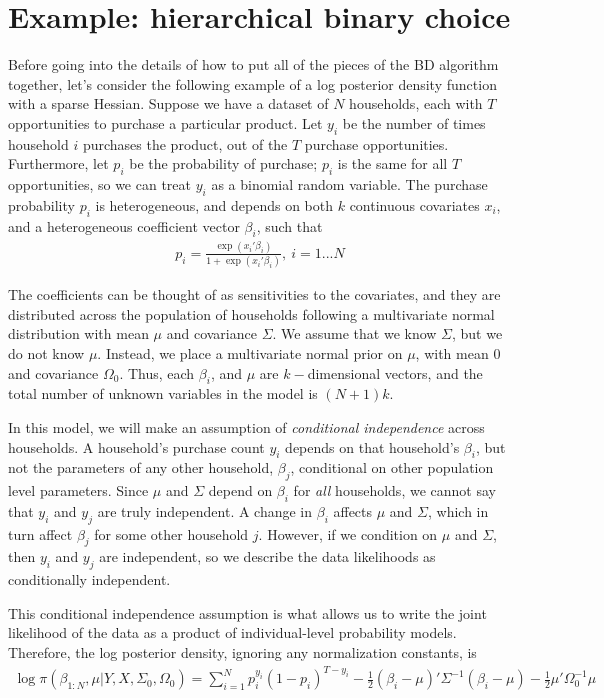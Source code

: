 \documentclass[10pt]{article}\usepackage[]{graphicx}\usepackage[]{color}
\begin{document}
\section{Example:  hierarchical binary choice}\label{sec:example}

Before going into the details of how to put all of the pieces of the
BD algorithm together, let's
consider the following example of a log posterior density function
with a sparse Hessian.
 Suppose we have a dataset of $N$ households, each with $T$
 opportunities to purchase a particular product.  Let $y_i$ be the
 number of times household $i$ purchases the product, out of the $T$
 purchase opportunities.  Furthermore, let $p_i$ be the probability of
 purchase; $p_i$ is the same for all $T$ opportunities, so we can treat $y_i$ as a binomial random variable.  The purchase probability
 $p_i$ is heterogeneous, and depends on both $k$ continuous covariates
 $x_i$, and a heterogeneous coefficient vector $\beta_i$, such that
\begin{align}
  p_i=\frac{\exp(x_i'\beta_i)}{1+\exp(x_i'\beta_i)},~i=1 ... N
\end{align}

The coefficients can be thought of as sensitivities to the covariates,
and they are distributed across the population of households following
a multivariate normal distribution with mean $\mu$ and covariance
$\Sigma$.   We assume that we know $\Sigma$, but we do not know $\mu$.
Instead, we place a multivariate normal prior on $\mu$, with mean $0$
and covariance $\Omega_0$.  Thus, each $\beta_i$, and $\mu$ are
$k-$dimensional vectors, and the total number of unknown variables in
the model is $(N+1)k$.

In this model, we will make an assumption of \emph{conditional
independence} across households.   A household's purchase count $y_i$
depends on that household's $\beta_i$, but not the
parameters of any other household, $\beta_j$, conditional on other
population level parameters.  Since $\mu$ and $\Sigma$ depend on
$\beta_i$ for \emph{all} households, we cannot say that $y_i$ and $y_j$ are
truly independent.  A change in $\beta_i$ affects $\mu$ and
$\Sigma$, which in turn affect $\beta_j$ for some other household
$j$.  However, if we condition on $\mu$ and $\Sigma$, then $y_i$ and $y_j$
are independent, so we describe the data likelihoods as conditionally independent.

This conditional independence assumption is what allows us to write
the joint likelihood of the data as a product of individual-level
probability models.  Therefore, the log posterior density, ignoring any normalization constants, is
\begin{align}
  \log \pi(\beta_{1:N},\mu|Y, X, \Sigma_0,\Omega_0)=\sum_{i=1}^Np_i^{y_i}(1-p_i)^{T-y_i}
  -\frac{1}{2}\left(\beta_i-\mu\right)'\Sigma^{-1}\left(\beta_i-\mu\right)
-\frac{1}{2}\mu'\Omega_0^{-1}\mu
\end{align}
\end{document}
